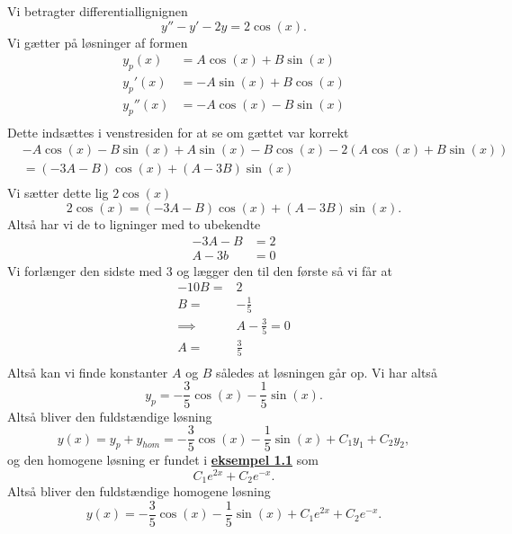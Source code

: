 \begin{eks}
  Vi betragter differentiallignignen
  \[
  y''-y'-2y = 2 \cos \left( x \right) 
  .\]
  Vi gætter på løsninger af formen
  \begin{align*}
    y_p(x) &= A \cos \left( x \right) + B \sin \left( x \right) \\
    y_p'(x) &= -A \sin \left( x \right) + B \cos \left( x \right)  \\
    y_p''(x) &= -A \cos \left( x \right) - B \sin \left( x \right)  \\
  \end{align*}
  Dette indsættes i venstresiden for at se om gættet var korrekt
  \begin{align*}
  &-A \cos \left( x \right) - B \sin \left( x \right) + A \sin \left( x \right) - B \cos \left( x \right) - 2\left( A \cos \left( x \right) + B \sin \left( x \right)  \right) \\
  &= (-3A-B)\cos \left( x \right) + (A - 3B)\sin \left( x \right)  \\
  \end{align*}
  Vi sætter dette lig $2 \cos \left( x \right) $
  \[
  2 \cos \left( x \right) = (-3A - B) \cos \left( x \right) + (A - 3B) \sin \left( x \right)
  .\]
  Altså har vi de to ligninger med to ubekendte
  \begin{align*}
    -3A-B &= 2 \\
    A-3b &= 0
  \end{align*}
  Vi forlænger den sidste med 3 og lægger den til den første så vi får at
  \begin{align*}
    -10B =& 2 \\
    B =& -\frac{1}{5} \\
    \implies& A - \frac{3}{5} = 0 \\
    A =& \frac{3}{5} \\
  \end{align*}
  Altså kan vi finde konstanter $A$ og $B$ således at løsningen går op. Vi har altså
  \[
  y_p = -\frac{3}{5}\cos \left( x \right) - \frac{1}{5}\sin \left( x \right) 
  .\]
  Altså bliver den fuldstændige løsning
  \[
  y(x) = y_p + y_{hom} = -\frac{3}{5}\cos \left( x \right) - \frac{1}{5}\sin \left( x \right) + C_1y_1 + C_2y_2 
  ,\]
  og den homogene løsning er fundet i \textbf{\hyperlink{eks:1.1}{eksempel 1.1}} som
  \[
  C_1e^{2x} + C_2e^{-x} 
  .\]
  Altså bliver den fuldstændige homogene løsning
  \[
  y(x) = -\frac{3}{5}\cos \left( x \right) - \frac{1}{5}\sin \left( x \right) + C_1e^{2x} + C_2e^{-x} 
  .\]
\end{eks}

